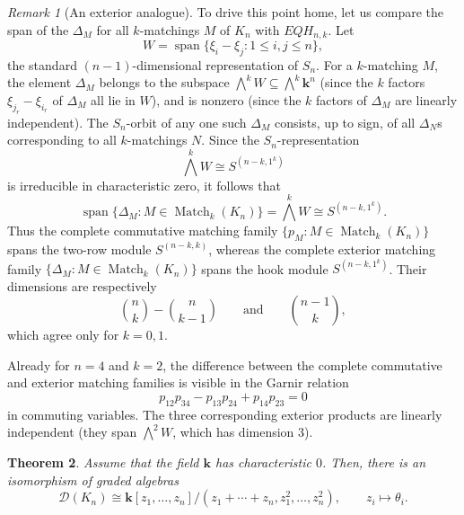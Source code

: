 \documentclass[12pt]{amsart}
\newtheorem{theorem}{Theorem}[section]
\theoremstyle{definition}
\theoremstyle{remark}
\newtheorem{remark}[theorem]{Remark}
\newcommand{\kk}{\mathbf{k}}
\newcommand{\Span}{\operatorname{span}}
\newcommand{\Match}{\operatorname{Match}}
\begin{document}
\begin{remark}[An exterior analogue]
To drive this point home, let us compare the span of the $\Delta_M$
for all $k$-matchings $M$ of $K_n$ with $EQH_{n,k}$.  Let
\[
 W=\Span\{\xi_i-\xi_j:1\leq i,j\leq n\},
\]
the standard $(n-1)$-dimensional representation of $S_n$.
For a $k$-matching $M$, the element $\Delta_M$ belongs to
the subspace $\bigwedge^k W\subseteq\bigwedge^k \kk^n$
(since the $k$ factors $\xi_{j_r} - \xi_{i_r}$ of $\Delta_M$ all lie in $W$),
and is nonzero (since the $k$ factors of $\Delta_M$
are linearly independent).  The $S_n$-orbit of any one such
$\Delta_M$ consists, up to sign, of all $\Delta_N$s corresponding
to all $k$-matchings $N$.  Since the $S_n$-representation
\[
 \bigwedge^k W\cong S^{(n-k,1^k)}
\]
is irreducible in characteristic zero, it follows that
\begin{equation}\label{eq:exterior-matching-span}
 \Span\{\Delta_M:M\in\Match_k(K_n)\}
 =\bigwedge^k W\cong S^{(n-k,1^k)}.
\end{equation}
Thus the complete commutative matching family
$\{p_M:M\in\Match_k(K_n)\}$ spans the two-row module
$S^{(n-k,k)}$, whereas the complete exterior matching family
$\{\Delta_M:M\in\Match_k(K_n)\}$ spans the hook
module $S^{(n-k,1^k)}$.  Their dimensions are respectively
\[
 \binom nk-\binom n{k-1}
 \qquad\text{and}\qquad
 \binom{n-1}{k},
\]
which agree only for $k=0,1$.

Already for $n=4$ and $k=2$, the difference between the complete
commutative and exterior matching families is visible in the Garnir relation
\[
 p_{12}p_{34}-p_{13}p_{24}+p_{14}p_{23}=0
\]
in commuting variables.  The three corresponding exterior products are
linearly independent (they span $\bigwedge^2W$, which has dimension $3$).
\end{remark}


\begin{theorem}\label{thm:presentation}
Assume that the field $\kk$ has characteristic $0$.
Then, there is an isomorphism of graded algebras
\[
 \mathcal D(K_n)\cong
 \kk[z_1,\ldots,z_n]/
 (z_1+\cdots+z_n,z_1^2,\ldots,z_n^2),
 \qquad z_i\longmapsto\theta_i.
\]
\end{theorem}
\end{document}
